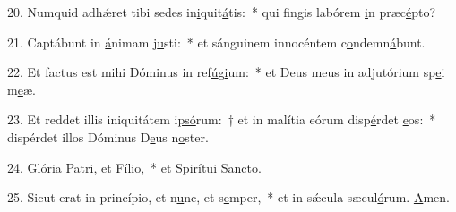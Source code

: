 20. Numquid adhǽret tibi sedes in\uline{i}quit\uline{á}tis:~* qui fingis labórem \uline{i}n præc\uline{é}pto?\par 
21. Captábunt in \uline{á}nimam j\uline{u}sti:~* et sánguinem innocéntem c\uline{o}ndemn\uline{á}bunt.\par 
22. Et factus est mihi Dóminus in ref\uline{ú}g\uline{i}um:~* et Deus meus in adjutórium sp\uline{e}i m\uline{e}æ.\par 
23. Et reddet illis iniquitátem i\uline{psó}rum:~† et in malítia eórum disp\uline{é}rdet \uline{e}os:~* dispérdet illos Dóminus D\uline{e}us n\uline{o}ster.\par 
24. Glória Patri, et F\uline{í}l\uline{i}o,~* et Spir\uline{í}tui S\uline{a}ncto.\par 
25. Sicut erat in princípio, et n\uline{u}nc, et s\uline{e}mper,~* et in sǽcula sæcul\uline{ó}rum. \uline{A}men.\par 

